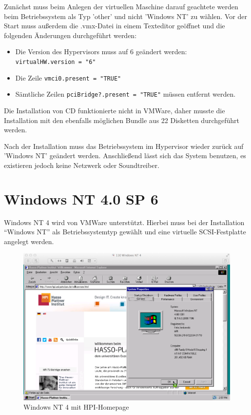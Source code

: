 	Zunächst muss beim Anlegen der virtuellen Maschine darauf geachtete werden beim Betriebssystem als Typ 'other' und nicht 'Windows NT' zu wählen.
	Vor der Start muss außerdem die .vmx-Datei in einem Texteditor geöffnet und die folgenden Änderungen durchgeführt werden:

		\begin{itemize}
			\item Die Version des Hypervisors muss auf 6 geändert werden: \\ \texttt{virtualHW.version = \string"6\string"}
			\item Die Zeile \texttt{vmci0.present = \string"TRUE\string"}
			\item Sämtliche Zeilen \texttt{pciBridge?.present = \string"TRUE\string"} müssen entfernt werden.
		\end{itemize}


	Die Installation von CD funktionierte nicht in VMWare, daher musste die Installation mit den ebenfalls möglichen Bundle aus 22 Disketten durchgeführt werden. 

	Nach der Installation muss das Betriebssystem im Hypervisor wieder zurück auf 'Windows NT' geändert werden. 
	Anschließend lässt sich das System benutzen, es existieren jedoch keine Netzwerk oder Soundtreiber.


\section{Windows NT 4.0 SP 6}

	Windows NT 4 wird von VMWare unterstützt. 
	Hierbei muss bei der Installation "`Windows NT"' als Betriebssystemtyp gewählt und eine virtuelle SCSI-Festplatte angelegt werden. 
	
		\begin{figure}[h]
		\begin{center}
			\includegraphics[width=\textwidth]{img/nt4}
			\caption{Windows NT 4 mit HPI-Homepage}
			\label{fig:screenshot-nt4}
		\end{center}
	\end{figure}


